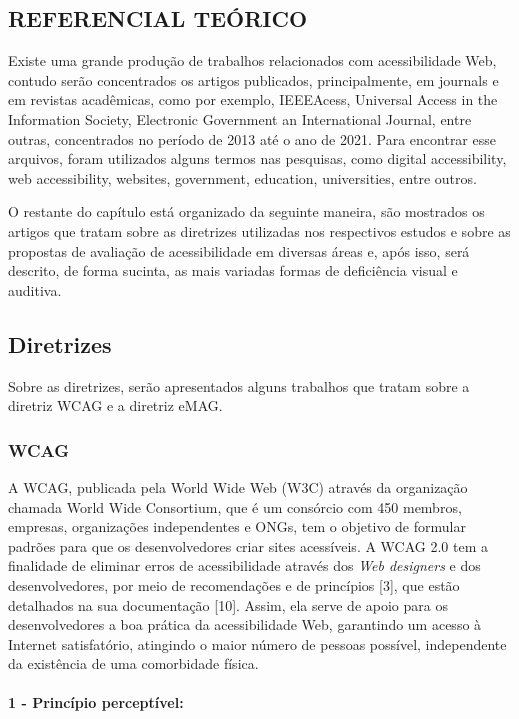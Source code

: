\documentclass[a4paper]{article}
\begin{document}
\begin{titlepage}
\section{REFERENCIAL TEÓRICO}
Existe uma grande produção de trabalhos relacionados com acessibilidade Web, contudo serão concentrados os artigos publicados, principalmente, em journals e em revistas acadêmicas, como por exemplo, IEEEAcess, Universal Access in the Information Society, Electronic Government an International Journal, entre outras, concentrados no período de 2013 até o ano de 2021. Para encontrar esse arquivos, foram utilizados alguns termos nas pesquisas, como digital accessibility, web accessibility, websites, government, education, universities, entre outros.

O restante do capítulo está organizado da seguinte maneira, são mostrados os artigos que tratam sobre as diretrizes utilizadas nos respectivos estudos e sobre as propostas de avaliação de acessibilidade em diversas áreas e, após isso, será descrito, de forma sucinta, as mais variadas formas de deficiência visual e auditiva.

\subsection{Diretrizes}
Sobre as diretrizes, serão apresentados alguns trabalhos que tratam sobre a diretriz WCAG e a diretriz eMAG.

\subsubsection{WCAG}

A WCAG, publicada pela World Wide Web (W3C) através da organização chamada World Wide Consortium, que é um consórcio com 450 membros, empresas, organizações independentes e ONGs, tem o objetivo de formular padrões para que os desenvolvedores criar sites acessíveis. A WCAG 2.0 tem a finalidade de eliminar erros de acessibilidade através dos \textit{Web designers} e dos desenvolvedores, por meio de recomendações e de princípios [3], que estão detalhados na sua documentação [10]. Assim, ela serve de apoio para os desenvolvedores a boa prática da acessibilidade Web, garantindo um acesso à Internet satisfatório, atingindo o maior número de pessoas possível, independente da existência de uma comorbidade física.

\paragraph{1 - Princípio perceptível:}


\end{titlepage}
\end{document}
